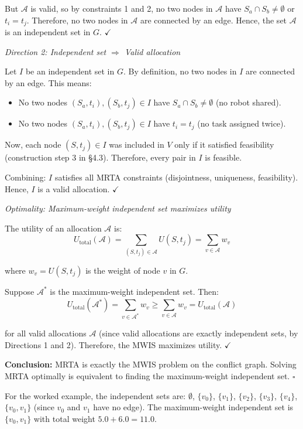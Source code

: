 But $\mathcal{A}$ is valid, so by constraints 1 and 2, no two nodes in $\mathcal{A}$ have $S_a \cap S_b \neq \emptyset$ or $t_i = t_j$. Therefore, no two nodes in $\mathcal{A}$ are connected by an edge. Hence, the set $\mathcal{A}$ is an independent set in $G$. $\checkmark$

\textit{Direction 2: Independent set $\Rightarrow$ Valid allocation}

Let $I$ be an independent set in $G$. By definition, no two nodes in $I$ are connected by an edge. This means:

\begin{itemize}
\item No two nodes $(S_a, t_i), (S_b, t_j) \in I$ have $S_a \cap S_b \neq \emptyset$ (no robot shared).
\item No two nodes $(S_a, t_i), (S_b, t_j) \in I$ have $t_i = t_j$ (no task assigned twice).
\end{itemize}

Now, each node $(S, t_j) \in I$ was included in $V$ only if it satisfied feasibility (construction step 3 in §4.3). Therefore, every pair in $I$ is feasible.

Combining: $I$ satisfies all MRTA constraints (disjointness, uniqueness, feasibility). Hence, $I$ is a valid allocation. $\checkmark$

\textit{Optimality: Maximum-weight independent set maximizes utility}

The utility of an allocation $\mathcal{A}$ is:
\[
U_{\text{total}}(\mathcal{A}) = \sum_{(S,t_j) \in \mathcal{A}} U(S, t_j) = \sum_{v \in \mathcal{A}} w_v
\]

where $w_v = U(S, t_j)$ is the weight of node $v$ in $G$.

Suppose $\mathcal{A}^*$ is the maximum-weight independent set. Then:
\[
U_{\text{total}}(\mathcal{A}^*) = \sum_{v \in \mathcal{A}^*} w_v \geq \sum_{v \in \mathcal{A}} w_v = U_{\text{total}}(\mathcal{A})
\]

for all valid allocations $\mathcal{A}$ (since valid allocations are exactly independent sets, by Directions 1 and 2). Therefore, the MWIS maximizes utility. $\checkmark$

\textbf{Conclusion:} MRTA is exactly the MWIS problem on the conflict graph. Solving MRTA optimally is equivalent to finding the maximum-weight independent set. \hfill $\square$

For the worked example, the independent sets are: $\emptyset$, $\{v_0\}$, $\{v_1\}$, $\{v_2\}$, $\{v_3\}$, $\{v_4\}$, $\{v_0, v_1\}$ (since $v_0$ and $v_1$ have no edge). The maximum-weight independent set is $\{v_0, v_1\}$ with total weight $5.0 + 6.0 = 11.0$.


